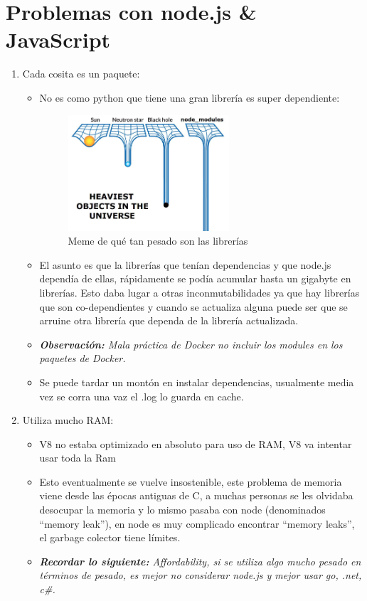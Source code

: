 \section{Problemas con node.js \& JavaScript}
\begin{enumerate}
    \item Cada cosita es un paquete:
        \begin{itemize}
            \item No es como python que tiene una gran librería es super dependiente:
            \begin{figure}[htbp]
                \centering
                \includegraphics[width=6cm,angle=90]{Clases/img/heavy_node_js.jpeg}
                \caption{Meme de qué tan pesado son las librerías}
                \label{}
            \end{figure} 
        
        \item El asunto es que la librerías que tenían dependencias y que node.js dependía de ellas, rápidamente se podía acumular hasta un gigabyte en librerías. Esto daba lugar a otras inconmutabilidades ya que hay librerías que son co-dependientes y cuando se actualiza alguna puede ser que se arruine otra librería que dependa de la librería actualizada.
        \item \emph{\textbf{Observación: }Mala práctica de Docker no incluir los modules en los paquetes de Docker.}
        \item Se puede tardar un montón en instalar dependencias, usualmente media vez se corra una vaz el .log lo guarda en cache.
        \end{itemize}
    
    \item Utiliza mucho RAM:
        \begin{itemize}
            \item V8 no estaba optimizado en absoluto para uso de RAM, V8 va intentar usar toda la Ram
            \item Esto eventualmente se vuelve insostenible, este problema de memoria viene desde las épocas antiguas de C, a muchas personas se les olvidaba desocupar la memoria y lo mismo pasaba con node (denominados ``memory leak''), en node es muy complicado encontrar ``memory leaks'', el garbage colector tiene límites.
            \item \emph{\textbf{Recordar lo siguiente: }Affordability, si se utiliza algo mucho pesado en términos de pesado, es mejor no considerar node.js y mejor usar go, .net, c\#.}
        \end{itemize}
    

\end{enumerate}
